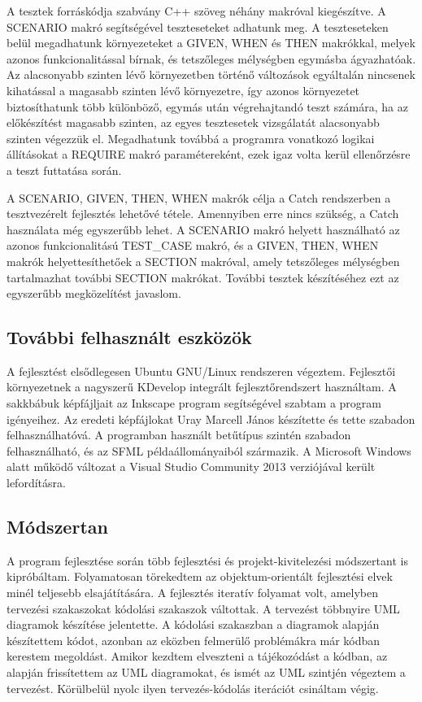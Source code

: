 \documentclass[12pt, twoside]{report}
\begin{document}
A tesztek forráskódja szabvány C++ szöveg néhány makróval kiegészítve. A SCENARIO makró segítségével teszteseteket adhatunk meg. A teszteseteken belül megadhatunk környezeteket a GIVEN, WHEN és THEN makrókkal, melyek azonos funkcionalitással bírnak, és tetszőleges mélységben egymásba ágyazhatóak. Az alacsonyabb szinten lévő környezetben történő változások egyáltalán nincsenek kihatással a magasabb szinten lévő környezetre, így azonos környezetet biztosíthatunk több különböző, egymás után végrehajtandó teszt számára, ha az előkészítést magasabb szinten, az egyes tesztesetek vizsgálatát alacsonyabb szinten végezzük el. Megadhatunk továbbá a programra vonatkozó logikai állításokat a REQUIRE makró paramétereként, ezek igaz volta kerül ellenőrzésre a teszt futtatása során.

A SCENARIO, GIVEN, THEN, WHEN makrók célja a Catch rendszerben a tesztvezérelt fejlesztés lehetővé tétele. Amennyiben erre nincs szükség, a Catch használata még egyszerűbb lehet. A SCENARIO makró helyett használható az azonos funkcionalitású TEST\_CASE makró, és a GIVEN, THEN, WHEN makrók helyettesíthetőek a SECTION makróval, amely tetszőleges mélységben tartalmazhat további SECTION makrókat. További tesztek készítéséhez ezt az egyszerűbb megközelítést javaslom.

\subsection{További felhasznált eszközök}

A fejlesztést elsődlegesen Ubuntu GNU/Linux rendszeren végeztem. Fejlesztői környezetnek a nagyszerű KDevelop integrált fejlesztőrendszert használtam. A sakkbábuk képfájljait az Inkscape program segítségével szabtam a program igényeihez. Az eredeti képfájlokat Uray Marcell János készítette és tette szabadon felhasználhatóvá. A programban használt betűtípus szintén szabadon felhasználható, és az SFML példaállományaiból származik. A Microsoft Windows alatt működő változat a Visual Studio Community 2013 verziójával került lefordításra.

\subsection{Módszertan}

A program fejlesztése során több fejlesztési és projekt-kivitelezési módszertant is kipróbáltam. Folyamatosan törekedtem az objektum-orientált fejlesztési elvek minél teljesebb elsajátítására. A fejlesztés iteratív folyamat volt, amelyben tervezési szakaszokat kódolási szakaszok váltottak. A tervezést többnyire UML diagramok készítése jelentette. A kódolási szakaszban a diagramok alapján készítettem kódot, azonban az eközben felmerülő problémákra már kódban kerestem megoldást. Amikor kezdtem elveszteni a tájékozódást a kódban, az alapján frissítettem az UML diagramokat, és ismét az UML szintjén végeztem a tervezést. Körülbelül nyolc ilyen tervezés-kódolás iterációt csináltam végig.
\end{document}
